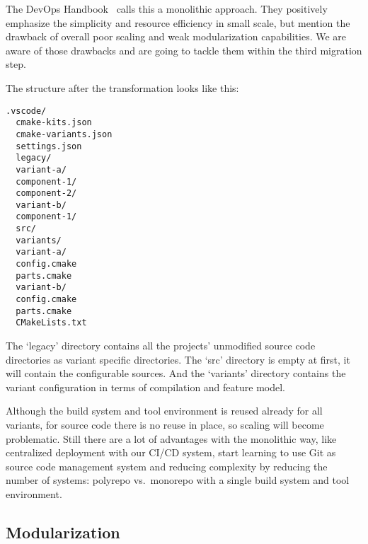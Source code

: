 The DevOps Handbook~\cite{devopshandbook} calls this a monolithic approach. They
positively emphasize the simplicity and resource efficiency in small scale, but
mention the drawback of overall poor scaling and weak modularization
capabilities. We are aware of those drawbacks and are going to tackle them
within the third migration step.

The structure after the transformation looks like this:
\begin{Verbatim}[frame=single,samepage=true]
  .vscode/
  cmake-kits.json
  cmake-variants.json
  settings.json
  legacy/
  variant-a/
  component-1/
  component-2/
  variant-b/
  component-1/
  src/
  variants/
  variant-a/
  config.cmake
  parts.cmake
  variant-b/
  config.cmake
  parts.cmake
  CMakeLists.txt
\end{Verbatim}

The `legacy' directory contains all the projects' unmodified source code
directories as variant specific directories. The `src' directory is empty at
first, it will contain the configurable sources. And the `variants' directory
contains the variant configuration in terms of compilation and feature model.

Although the build system and tool environment is reused already for all
variants, for source code there is no reuse in place, so scaling will become
problematic. Still there are a lot of advantages with the monolithic way, like
centralized deployment with our CI/CD system, start learning to use Git as
source code management system and reducing complexity by reducing the number of
systems: polyrepo vs.\ monorepo with a single build system and tool environment.

\subsection{Modularization}\label{modularization}

